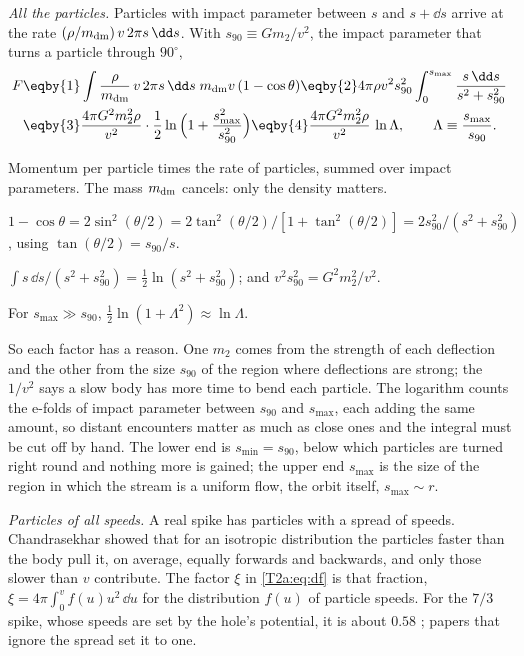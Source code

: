 \emph{All the particles.} Particles with impact parameter between $s$ and $s+\dd s$ arrive at the rate $(\rho/m_{\rm dm})\,v\,2\pi s\,\dd s$. With $s_{90}\equiv Gm_2/v^2$, the impact parameter that turns a particle through $90^\circ$,
\begin{align}
  F
  &\eqby{1}\int\frac{\rho}{m_{\rm dm}}\,v\,2\pi s\,\dd s\;m_{\rm dm}v\,(1-\cos\theta)
  \eqby{2}4\pi\rho v^2s_{90}^2\int_0^{s_{\max}}\frac{s\,\dd s}{s^2+s_{90}^2}\nonumber\\
  &\eqby{3}\frac{4\pi G^2m_2^2\rho}{v^2}\cdot\frac12\ln\Big(1+\frac{s_{\max}^2}{s_{90}^2}\Big)
  \eqby{4}\frac{4\pi G^2m_2^2\rho}{v^2}\,\ln\Lambda,\qquad\Lambda\equiv\frac{s_{\max}}{s_{90}} .\label{T2a:eq:df-derive}
\end{align}
\begin{explain}
  \item Momentum per particle times the rate of particles, summed over impact parameters. The mass $m_{\rm dm}$ cancels: only the density matters.
  \item $1-\cos\theta=2\sin^2(\theta/2)=2\tan^2(\theta/2)/[1+\tan^2(\theta/2)]=2s_{90}^2/(s^2+s_{90}^2)$, using $\tan(\theta/2)=s_{90}/s$.
  \item $\int s\,\dd s/(s^2+s_{90}^2)=\tfrac12\ln(s^2+s_{90}^2)$; and $v^2s_{90}^2=G^2m_2^2/v^2$.
  \item For $s_{\max}\gg s_{90}$, $\tfrac12\ln(1+\Lambda^2)\approx\ln\Lambda$.
\end{explain}
So each factor has a reason. One $m_2$ comes from the strength of each deflection and the other from the size $s_{90}$ of the region where deflections are strong; the $1/v^2$ says a slow body has more time to bend each particle. The logarithm counts the e-folds of impact parameter between $s_{90}$ and $s_{\max}$, each adding the same amount, so distant encounters matter as much as close ones and the integral must be cut off by hand. The lower end is $s_{\min}=s_{90}$, below which particles are turned right round and nothing more is gained; the upper end $s_{\max}$ is the size of the region in which the stream is a uniform flow, the orbit itself, $s_{\max}\sim r$.

\emph{Particles of all speeds.} A real spike has particles with a spread of speeds. Chandrasekhar showed that for an isotropic distribution the particles faster than the body pull it, on average, equally forwards and backwards, and only those slower than $v$ contribute. The factor $\xi$ in \eqref{T2a:eq:df} is that fraction, $\xi=4\pi\int_0^vf(u)u^2\,\dd u$ for the distribution $f(u)$ of particle speeds. For the $7/3$ spike, whose speeds are set by the hole's potential, it is about $0.58$ \cite{Coogan2022}; papers that ignore the spread set it to one.

